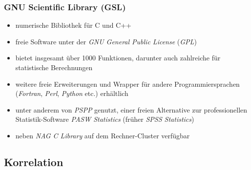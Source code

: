 \documentclass{beamer}
\begin{document}
\begin{frame}
  \frametitle{GNU Scientific Library (GSL)}
  
  \begin{itemize}
  	\item numerische Bibliothek für C und C++
		\item freie Software unter der {\it GNU General Public License} ({\it GPL})
		\item bietet insgesamt über 1000 Funktionen, darunter auch zahlreiche für statistische Berechnungen
		\item weitere freie Erweiterungen und Wrapper für andere Programmiersprachen ({\it Fortran}, {\it Perl}, {\it Python} etc.) erhältlich
		\item unter anderem von {\it PSPP} genutzt, einer freien Alternative zur professionellen Statistik-Software {\it PASW Statistics} (früher {\it SPSS Statistics})
		\item neben {\it NAG C Library} auf dem Rechner-Cluster verfügbar
  \end{itemize}
\end{frame}

\subsection{Korrelation}
\end{document}
